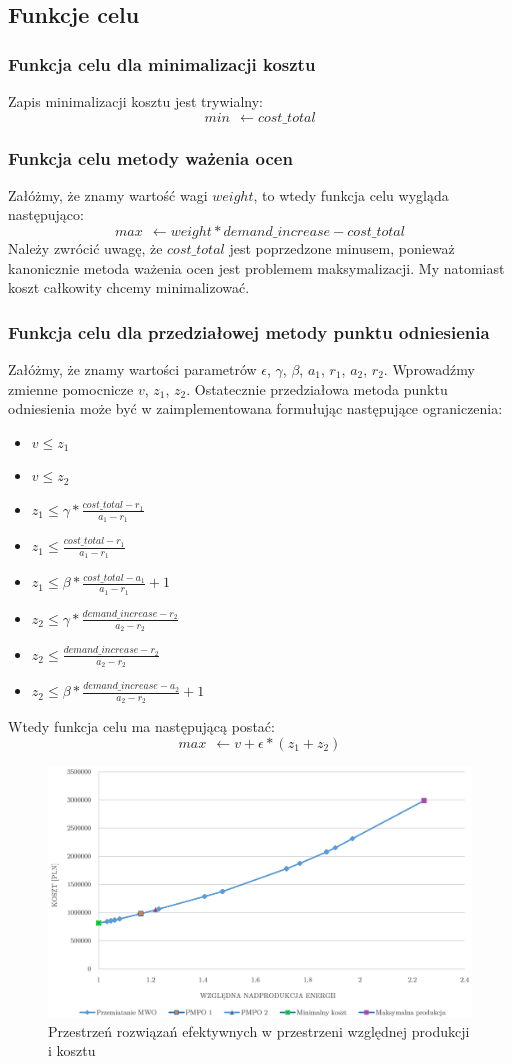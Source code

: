 \documentclass[12pt, twoside, hidelinks, a4paper]{article}
\begin{document}
\subsection{Funkcje celu}
\subsubsection{Funkcja celu dla minimalizacji kosztu}
Zapis minimalizacji kosztu jest trywialny:
$$min \: \: \leftarrow cost\_total$$

\subsubsection{Funkcja celu metody ważenia ocen}
Załóżmy, że znamy wartość wagi $weight$, to wtedy funkcja celu wygląda następująco:
$$max \: \: \leftarrow weight*demand\_increase - cost\_total$$
Należy zwrócić uwagę, że $cost\_total$ jest poprzedzone minusem, ponieważ kanonicznie metoda ważenia ocen jest problemem maksymalizacji. My natomiast koszt całkowity chcemy minimalizować.

\subsubsection{Funkcja celu dla przedziałowej metody punktu odniesienia}
Załóżmy, że znamy wartości parametrów $\epsilon$, $\gamma$, $\beta$, $a_1$, $r_1$, $a_2$, $r_2$. Wprowadźmy zmienne pomocnicze $v$, $z_1$, $z_2$. Ostatecznie przedziałowa metoda punktu odniesienia może być w zaimplementowana formułując następujące ograniczenia:
\begin{itemize}
\item $v \leqslant z_1$
\item $v \leqslant z_2$
\item $z_1 \leqslant \gamma * \frac{cost\_total - r_1}{a_1 - r_1}$
\item $z_1 \leqslant \frac{cost\_total - r_1}{a_1 - r_1}$
\item $z_1 \leqslant \beta * \frac{cost\_total - a_1}{a_1 - r_1} + 1$
\item $z_2 \leqslant \gamma * \frac{demand\_increase - r_2}{a_2 - r_2}$
\item $z_2 \leqslant \frac{demand\_increase - r_2}{a_2 - r_2}$
\item $z_2 \leqslant \beta * \frac{demand\_increase - a_2}{a_2 - r_2} + 1$
\end{itemize}
Wtedy funkcja celu ma następującą postać:
$$max \: \: \leftarrow v + \epsilon * (z_1 + z_2)$$

\begin{figure}[H]
\centering
\includegraphics[scale=0.35]{plot.png}
\caption{Przestrzeń rozwiązań efektywnych w przestrzeni względnej produkcji i kosztu}
\label{fig:plot}
\end{figure}

\end{document}
